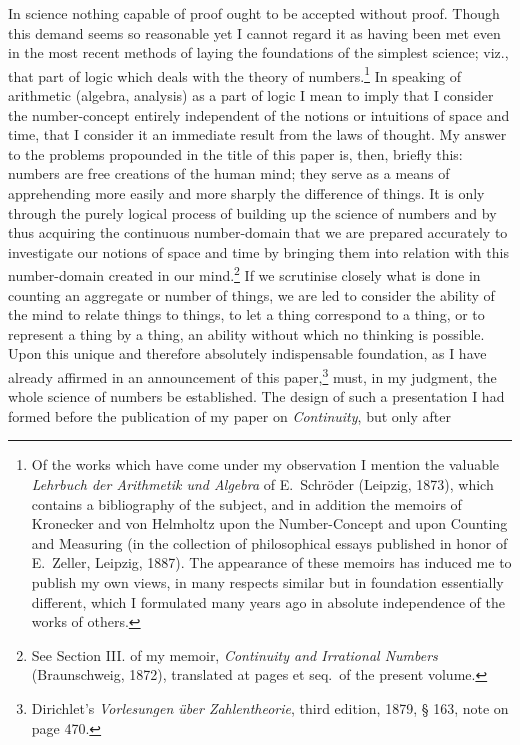 \documentclass[oneside]{book}
\begin{document}
In science nothing capable of proof ought to be accepted
without proof. Though this demand seems
so reasonable yet I cannot regard it as having been
met even in the most recent methods of laying the
foundations of the simplest science; viz., that part of
logic which deals with the theory of numbers.\footnote{Of the works which have come under my observation I mention the valuable
\textit{Lehrbuch der Arithmetik und Algebra} of E.~Schröder (Leipzig, 1873),
which contains a bibliography of the subject, and in addition the memoirs of
Kronecker and von Helmholtz upon the Number-Concept and upon Counting
and Measuring (in the collection of philosophical essays published in honor
of E.~Zeller, Leipzig, 1887). The appearance of these memoirs has induced
me to publish my own views, in many respects similar but in foundation
essentially different, which I formulated many years ago in absolute independence
of the works of others.} In
speaking of arithmetic (algebra, analysis) as a part
of logic I mean to imply that I consider the number-concept
entirely independent of the notions or intuitions
of space and time, that I consider it an immediate
result from the laws of thought. My answer to
the problems propounded in the title of this paper is,
then, briefly this: numbers are free creations of the
human mind; they serve as a means of apprehending
more easily and more sharply the difference of things.
It is only through the purely logical process of building
up the science of numbers and by thus acquiring
the continuous number-domain that we are prepared
accurately to investigate our notions of space and
time by bringing them into relation with this number-domain
created in our mind.\footnote{See Section III. of my memoir, \textit{Continuity and Irrational Numbers}
(Braunschweig, 1872), translated at pages \pageref{EISIII} et seq.\ of the present volume.} If we scrutinise closely
what is done in counting an aggregate or number
of things, we are led to consider the ability of the
mind to relate things to things, to let a thing correspond
to a thing, or to represent a thing by a thing,
an ability without which no thinking is possible.
Upon this unique and therefore absolutely indispensable
foundation, as I have already affirmed in an announcement
of this paper,\footnote{Dirichlet's \textit{Vorlesungen über Zahlentheorie}, third edition, 1879, § 163, note
on page 470.} must, in my judgment,
the whole science of numbers be established. The
design of such a presentation I had formed before the
publication of my paper on \textit{Continuity}, but only after
\end{document}
